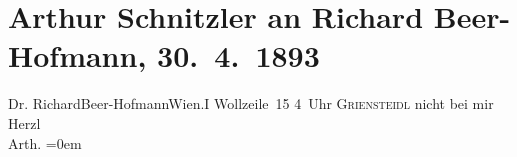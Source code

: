 

         
         \renewcommand{\erwaehntePersonen}{Personen: Richard Beer-Hofmann}
         \renewcommand{\erwaehnteOrte}{Orte: Café Griensteidl, Wien, Wollzeile}
         \renewcommand{\erwaehnteWerke}{}
               \section[Arthur Schnitzler an Richard Beer-Hofmann, 30. 4. 1893]{ Arthur Schnitzler an Richard Beer-Hofmann, 30. 4. 1893}\nopagebreak{}\rehead{ }\begin{ledgroupsized}[t]{13cm}\normalsize\beginnumbering \toendnotes[C]{\smallbreak\pagebreak[2]} 
\pstart{}{\pb}Dr. Richard\pend{}\pstart{}Beer-Hofmann\pend{}\pstart{}Wien.\pend{}\pstart{}I Wollzeile 15\pend{}{\bigskip}\pstart
           \noindent{}{\pb}4 Uhr{ }\textsc{Griensteidl}\pend
           \pstart
           nicht bei mir\pend
           \pstart
           Herzl{\\[\baselineskip]}\spacefill\mbox{Arth.}\pend
           \leftskip=0em{}
         
         \endnumbering{}\end{ledgroupsized}  \newcommand{\dateiname}{L00205}\newcommand{\titel}{Arthur Schnitzler an Richard Beer-Hofmann, 30. 4. 1893}\newcommand{\editorInnen}{Martin Anton Müller und Gerd-Hermann Susen}
      